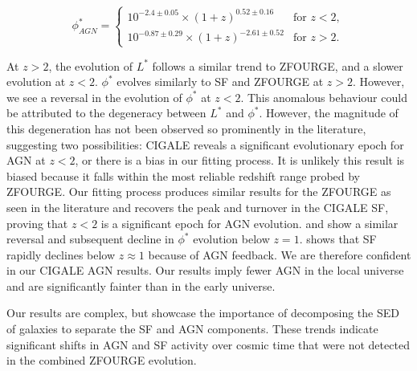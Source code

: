 \begin{equation*}
    \phi^{*}_{AGN} =
    \begin{cases} 
        10^{-2.4 \pm 0.05} \times (1+z)^{0.52 \pm 0.16} & \text{for } z < 2, \\
        10^{-0.87 \pm 0.29} \times (1+z)^{-2.61 \pm 0.52} & \text{for } z > 2.
    \end{cases}
\end{equation*}

At $z>2$, the evolution of $L^{*}$ follows a similar trend to ZFOURGE, and a slower evolution at $z<2$. $\phi^{*}$ evolves similarly to SF and ZFOURGE at $z>2$. However, we see a reversal in the evolution of $\phi^{*}$ at $z<2$. This anomalous behaviour could be attributed to the degeneracy between $L^{*}$ and $\phi^{*}$. However, the magnitude of this degeneration has not been observed so prominently in the literature, suggesting two possibilities: CIGALE reveals a significant evolutionary epoch for AGN at $z<2$, or there is a bias in our fitting process. It is unlikely this result is biased because it falls within the most reliable redshift range probed by ZFOURGE. Our fitting process produces similar results for the ZFOURGE as seen in the literature and recovers the peak and turnover in the CIGALE SF, proving that $z<2$ is a significant epoch for AGN evolution. \cite{hopkins_observational_2007} and \cite{delvecchio_tracing_2014} show a similar reversal and subsequent decline in $\phi^{*}$ evolution below $z=1$. \cite{katsianis_evolution_2017} shows that SF rapidly declines below $z\approx1$ because of AGN feedback. We are therefore confident in our CIGALE AGN results. Our results imply fewer AGN in the local universe and are significantly fainter than in the early universe. 

Our results are complex, but showcase the importance of decomposing the SED of galaxies to separate the SF and AGN components. These trends indicate significant shifts in AGN and SF activity over cosmic time that were not detected in the combined ZFOURGE evolution.